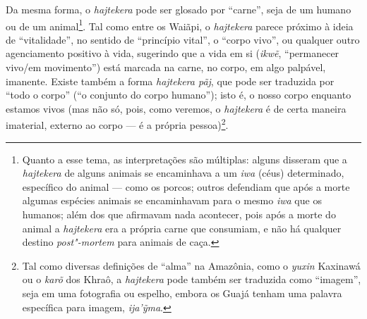 Da mesma forma, o \emph{hajtekera} pode ser glosado por ``carne'', seja de
um humano ou de um animal\footnote{Quanto a esse tema, as interpretações
  são múltiplas: alguns disseram que a \emph{hajtekera} de alguns
  animais se encaminhava a um \emph{iwa} (céus) determinado, específico
  do animal --- como os porcos; outros defendiam que após a morte algumas
  espécies animais se encaminhavam para o mesmo \emph{iwa} que os
  humanos; além dos que afirmavam nada acontecer, pois após a morte do
  animal a \emph{hajtekera} era a própria carne que consumiam, e não há
  qualquer destino \emph{post"-mortem} para animais de caça.}. Tal como
entre os Waiãpi, o \emph{hajtekera} parece próximo à ideia de
``vitalidade'', no sentido de ``princípio vital'', o ``corpo vivo'', ou
qualquer outro agenciamento positivo à vida, sugerindo que a vida em si
(\emph{ikwẽ}, ``permanecer vivo/em movimento'') está marcada na carne, no
corpo, em algo palpável, imanente. Existe também a forma \emph{hajtekera
pãj}, que pode ser traduzida por ``todo o corpo'' (``o conjunto do corpo
humano''); isto é, o nosso corpo enquanto estamos vivos (mas não só,
pois, como veremos, o \emph{hajtekera} é de certa maneira imaterial,
externo ao corpo --- é a própria pessoa)\footnote{Tal como diversas
  definições de ``alma'' na Amazônia, como o \emph{yuxin} Kaxinawá ou o
  \emph{karõ} dos Khraô, a \emph{hajtekera} pode também ser traduzida
  como ``imagem'', seja em uma fotografia ou espelho, embora os Guajá
  tenham uma palavra específica para imagem, \emph{ija'ỹma}.}.

